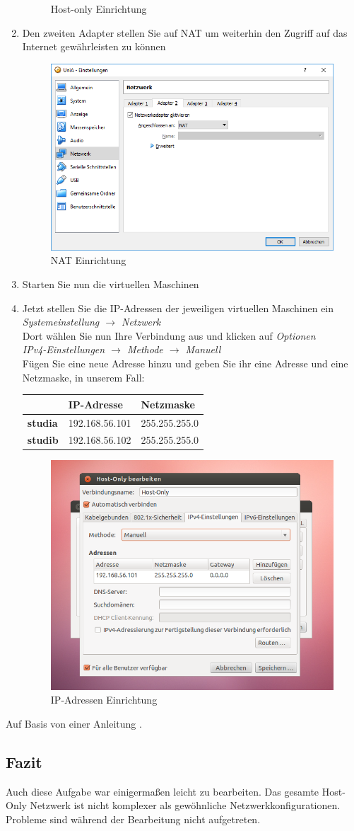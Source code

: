 \begin{enumerate}
\begin{figure}[H]
			\caption{Host-only Einrichtung}
		\end{figure}
		\item Den zweiten Adapter stellen Sie auf NAT um weiterhin den Zugriff auf das Internet gewährleisten zu können
		\begin{figure}[H]
			\centering
			\includegraphics[width=0.4 \linewidth]{images/9}
			\caption{NAT Einrichtung}
		\end{figure}
		\item Starten Sie nun die virtuellen Maschinen
		\item Jetzt stellen Sie die IP-Adressen der jeweiligen virtuellen Maschinen ein \\
		\textit{Systemeinstellung $\longrightarrow$ Netzwerk}\\
		Dort wählen Sie nun Ihre Verbindung aus und klicken auf \textit{Optionen}  \\		\textit{IPv4-Einstellungen $\longrightarrow$ Methode $\longrightarrow$ Manuell} \\ Fügen Sie eine neue Adresse hinzu und geben Sie ihr eine Adresse und eine Netzmaske, in unserem Fall: \\
		\begin{table}[H]
			\tablestyle
			\begin{tabular}{lll}
				\toprule
				& IP-Adresse & Netzmaske \tabularnewline
				
				\midrule
				\textbf{studia} & 192.168.56.101 & 255.255.255.0 \tabularnewline
				\textbf{studib} & 192.168.56.102 & 255.255.255.0 \tabularnewline
			
			\end{tabular}
		\end{table}
		
		\begin{figure}[H]
			\centering
			\includegraphics[width=0.4 \linewidth]{images/10}
			\caption{IP-Adressen Einrichtung}
		\end{figure}
\end{enumerate}
Auf Basis von einer Anleitung \cite{long:2013}.

\subsection{Fazit}
Auch diese Aufgabe war einigermaßen leicht zu bearbeiten. Das gesamte Host-Only Netzwerk ist nicht komplexer als gewöhnliche Netzwerkkonfigurationen. Probleme sind während der Bearbeitung nicht aufgetreten. 
